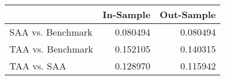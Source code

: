 \begin{tabular}{lrr}
\toprule
{} &  In-Sample &  Out-Sample \\
\midrule
SAA vs. Benchmark &   0.080494 &    0.080494 \\
TAA vs. Benchmark &   0.152105 &    0.140315 \\
TAA vs. SAA       &   0.128970 &    0.115942 \\
\bottomrule
\end{tabular}

